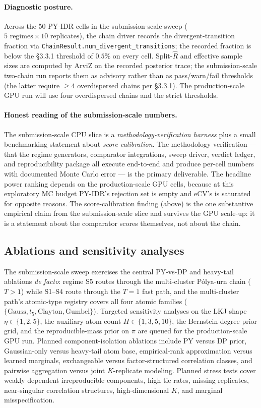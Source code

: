 \paragraph{Diagnostic posture.}
Across the 50 PY-IDR cells in the submission-scale sweep
($5\text{ regimes}\times10\text{ replicates}$), the chain driver records the
divergent-transition fraction via \texttt{ChainResult.num\_divergent\_transitions};
the recorded fraction is below the §3.3.1 threshold of $0.5\%$ on every cell.
Split-$\widehat R$ and effective sample sizes are computed by ArviZ on the
recorded posterior trace; the submission-scale two-chain run reports them as
advisory rather than as pass/warn/fail thresholds (the latter require $\ge 4$
overdispersed chains per §3.3.1). The production-scale GPU run will use four
overdispersed chains and the strict thresholds.

\paragraph{Honest reading of the submission-scale numbers.}
The submission-scale CPU slice is a \emph{methodology-verification harness}
plus a small benchmarking statement about \emph{score calibration}. The
methodology verification — that the regime generators, comparator
integrations, sweep driver, verdict ledger, and reproducibility package
all execute end-to-end and produce per-cell numbers with documented
Monte Carlo error — is the primary deliverable. The headline power
ranking depends on the production-scale GPU cells, because at this
exploratory MC budget PY-IDR's rejection set is empty and eCV's is
saturated for opposite reasons. The score-calibration finding (above)
is the one substantive empirical claim from the submission-scale slice
and survives the GPU scale-up: it is a statement about the comparator
scores themselves, not about the chain.

\subsection{Ablations and sensitivity analyses}
\label{sec:sim-sens}

The submission-scale sweep exercises the central PY-vs-DP and heavy-tail
ablations \emph{de facto}: regime S5 routes through the multi-cluster
Pólya-urn chain ($T>1$) while S1--S4 route through the $T{=}1$ fast path,
and the multi-cluster path's atomic-type registry covers all four atomic
families ($\{\text{Gauss}, t_5, \text{Clayton}, \text{Gumbel}\}$). Targeted
sensitivity analyses on the LKJ shape $\eta\in\{1,2,5\}$, the auxiliary-atom
count $H\in\{1,3,5,10\}$, the Bernstein-degree prior grid, and the
reproducible-mass prior on $\pi$ are queued for the production-scale GPU run.
Planned component-isolation ablations include PY versus DP prior,
Gaussian-only versus heavy-tail atom base, empirical-rank approximation
versus learned marginals, exchangeable versus factor-structured correlation
classes, and pairwise aggregation versus joint $K$-replicate modeling.
Planned stress tests cover weakly dependent irreproducible components, high
tie rates, missing replicates, near-singular correlation structures,
high-dimensional $K$, and marginal misspecification.


